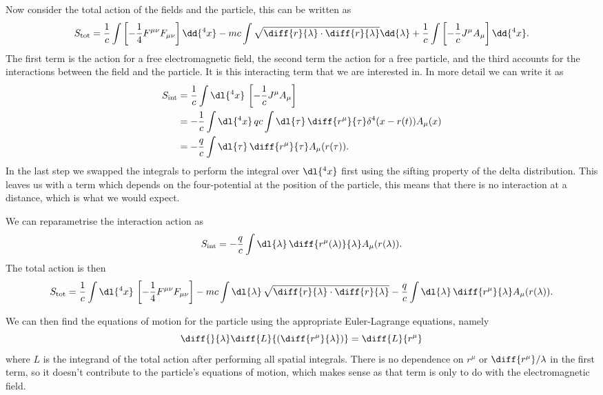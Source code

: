 \documentclass[fleqn]{NotesClass}
\newcommand*{\lagrangian}{L}
\begin{document}
    Now consider the total action of the fields and the particle, this can be written as
    \begin{equation*}
        S_{\text{tot}} = \frac{1}{c}\int \left[ -\frac{1}{4}F^{\mu\nu}F_{\mu\nu} \right] \dd{^4x} - mc \int \sqrt{\diff{r}{\lambda} \cdot \diff{r}{\lambda}} \dd{\lambda} + \frac{1}{c} \int \left[ -\frac{1}{c}J^\mu A_\mu \right] \dd{^4x}.
    \end{equation*}
    The first term is the action for a free electromagnetic field, the second term the action for a free particle, and the third accounts for the interactions between the field and the particle.
    It is this interacting term that we are interested in.
    In more detail we can write it as
    \begin{align}
        S_{\text{int}} &= \frac{1}{c}\int \dl{^4x} \, \left[ -\frac{1}{c}J^\mu A_\mu \right]\\
        &= -\frac{1}{c} \int \dl{^4x} \, qc \int \dl{\tau} \, \diff{r^\mu}{\tau} \delta^4(x - r(t)) A_\mu(x)\\
        &= -\frac{q}{c} \int \dl{\tau} \, \diff{r^\mu}{\tau} A_\mu(r(\tau)).
    \end{align}
    In the last step we swapped the integrals to perform the integral over \(\dl{^4x}\) first using the sifting property of the delta distribution.
    This leaves us with a term which depends on the four-potential at the position of the particle, this means that there is no interaction at a distance, which is what we would expect.
    
    We can reparametrise the interaction action as
    \begin{equation}
        S_{\text{int}} = -\frac{q}{c} \int \dl{\lambda} \, \diff{r^\mu(\lambda)}{\lambda} A_\mu(r(\lambda)).
    \end{equation}
    The total action is then
    \begin{equation}
        S_{\text{tot}} = \frac{1}{c}\int \dl{^4x}\, \left[ -\frac{1}{4}F^{\mu\nu}F_{\mu\nu} \right] -mc \int \dl{\lambda} \, \sqrt{\diff{r}{\lambda} \cdot \diff{r}{\lambda}} - \frac{q}{c} \int \dl{\lambda} \, \diff{r^\mu}{\lambda} A_\mu(r(\lambda)).
    \end{equation}
    
    We can then find the equations of motion for the particle using the appropriate Euler-Lagrange equations, namely
    \begin{equation}
        \diff{}{\lambda} \diff{\lagrangian}{\left( \diff{r^\mu}{\lambda} \right)} = \diff{\lagrangian}{r^\mu}
    \end{equation}
    where \(\lagrangian\) is the integrand of the total action after performing all spatial integrals.
    There is no dependence on \(r^\mu\) or \(\diff{r^\mu}/{\lambda}\) in the first term, so it doesn't contribute to the particle's equations of motion, which makes sense as that term is only to do with the electromagnetic field.
    
\end{document}
